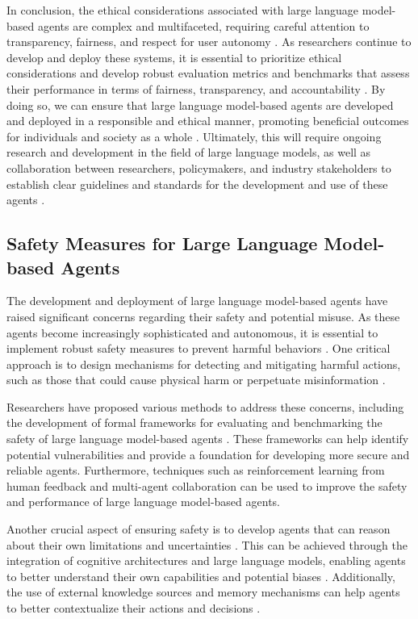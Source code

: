 \documentclass[11pt,a4paper]{article}
\begin{document}
In conclusion, the ethical considerations associated with large language model-based agents are complex and multifaceted, requiring careful attention to transparency, fairness, and respect for user autonomy \cite{arxiv:2303.18223}. As researchers continue to develop and deploy these systems, it is essential to prioritize ethical considerations and develop robust evaluation metrics and benchmarks that assess their performance in terms of fairness, transparency, and accountability \cite{arxiv:2410.02644}. By doing so, we can ensure that large language model-based agents are developed and deployed in a responsible and ethical manner, promoting beneficial outcomes for individuals and society as a whole \cite{arxiv:2404.01023}. Ultimately, this will require ongoing research and development in the field of large language models, as well as collaboration between researchers, policymakers, and industry stakeholders to establish clear guidelines and standards for the development and use of these agents \cite{arxiv:2402.01364}.


\subsection{Safety Measures for Large Language Model-based Agents}


The development and deployment of large language model-based agents have raised significant concerns regarding their safety and potential misuse. As these agents become increasingly sophisticated and autonomous, it is essential to implement robust safety measures to prevent harmful behaviors \cite{doi:10.1038/s41746-024-01083-y}. One critical approach is to design mechanisms for detecting and mitigating harmful actions, such as those that could cause physical harm or perpetuate misinformation \cite{arxiv:2402.11208}. 

Researchers have proposed various methods to address these concerns, including the development of formal frameworks for evaluating and benchmarking the safety of large language model-based agents \cite{arxiv:2410.02644}. These frameworks can help identify potential vulnerabilities and provide a foundation for developing more secure and reliable agents. Furthermore, techniques such as reinforcement learning from human feedback \cite{doi:10.18653/v1/2021.naacl-main.341} and multi-agent collaboration \cite{arxiv:2402.12914} can be used to improve the safety and performance of large language model-based agents.

Another crucial aspect of ensuring safety is to develop agents that can reason about their own limitations and uncertainties \cite{arxiv:2205.05718}. This can be achieved through the integration of cognitive architectures and large language models, enabling agents to better understand their own capabilities and potential biases \cite{doi:10.1609/aaaiss.v2i1.27691}. Additionally, the use of external knowledge sources and memory mechanisms can help agents to better contextualize their actions and decisions \cite{doi:10.1609/aaaiss.v2i1.27688}.
\end{document}

